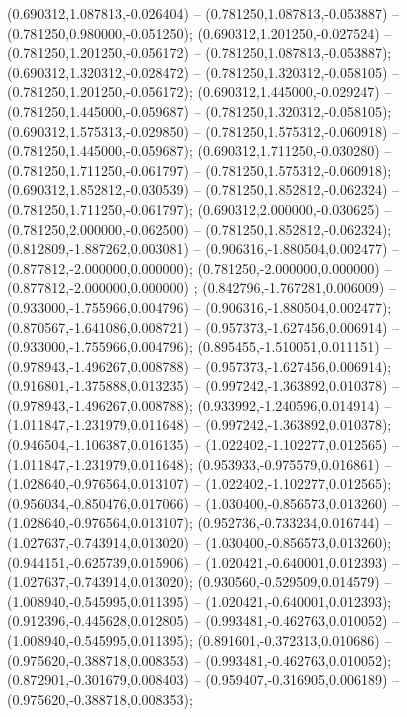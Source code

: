  (0.690312,1.087813,-0.026404) -- (0.781250,1.087813,-0.053887) -- (0.781250,0.980000,-0.051250);
 (0.690312,1.201250,-0.027524) -- (0.781250,1.201250,-0.056172) -- (0.781250,1.087813,-0.053887);
 (0.690312,1.320312,-0.028472) -- (0.781250,1.320312,-0.058105) -- (0.781250,1.201250,-0.056172);
 (0.690312,1.445000,-0.029247) -- (0.781250,1.445000,-0.059687) -- (0.781250,1.320312,-0.058105);
 (0.690312,1.575313,-0.029850) -- (0.781250,1.575312,-0.060918) -- (0.781250,1.445000,-0.059687);
 (0.690312,1.711250,-0.030280) -- (0.781250,1.711250,-0.061797) -- (0.781250,1.575312,-0.060918);
 (0.690312,1.852812,-0.030539) -- (0.781250,1.852812,-0.062324) -- (0.781250,1.711250,-0.061797);
 (0.690312,2.000000,-0.030625) -- (0.781250,2.000000,-0.062500) -- (0.781250,1.852812,-0.062324);
 (0.812809,-1.887262,0.003081) -- (0.906316,-1.880504,0.002477) -- (0.877812,-2.000000,0.000000);
 (0.781250,-2.000000,0.000000) -- (0.877812,-2.000000,0.000000) ;
 (0.842796,-1.767281,0.006009) -- (0.933000,-1.755966,0.004796) -- (0.906316,-1.880504,0.002477);
 (0.870567,-1.641086,0.008721) -- (0.957373,-1.627456,0.006914) -- (0.933000,-1.755966,0.004796);
 (0.895455,-1.510051,0.011151) -- (0.978943,-1.496267,0.008788) -- (0.957373,-1.627456,0.006914);
 (0.916801,-1.375888,0.013235) -- (0.997242,-1.363892,0.010378) -- (0.978943,-1.496267,0.008788);
 (0.933992,-1.240596,0.014914) -- (1.011847,-1.231979,0.011648) -- (0.997242,-1.363892,0.010378);
 (0.946504,-1.106387,0.016135) -- (1.022402,-1.102277,0.012565) -- (1.011847,-1.231979,0.011648);
 (0.953933,-0.975579,0.016861) -- (1.028640,-0.976564,0.013107) -- (1.022402,-1.102277,0.012565);
 (0.956034,-0.850476,0.017066) -- (1.030400,-0.856573,0.013260) -- (1.028640,-0.976564,0.013107);
 (0.952736,-0.733234,0.016744) -- (1.027637,-0.743914,0.013020) -- (1.030400,-0.856573,0.013260);
 (0.944151,-0.625739,0.015906) -- (1.020421,-0.640001,0.012393) -- (1.027637,-0.743914,0.013020);
 (0.930560,-0.529509,0.014579) -- (1.008940,-0.545995,0.011395) -- (1.020421,-0.640001,0.012393);
 (0.912396,-0.445628,0.012805) -- (0.993481,-0.462763,0.010052) -- (1.008940,-0.545995,0.011395);
 (0.891601,-0.372313,0.010686) -- (0.975620,-0.388718,0.008353) -- (0.993481,-0.462763,0.010052);
 (0.872901,-0.301679,0.008403) -- (0.959407,-0.316905,0.006189) -- (0.975620,-0.388718,0.008353);
